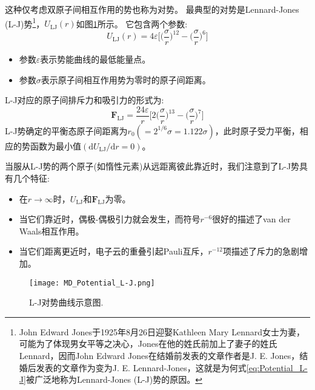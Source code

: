 这种仅考虑双原子间相互作用的势也称为对势。%
最典型的对势是\textrm{Lennard-Jones (L-J)}势\cite{PRS106-463_1924}\footnote{\textrm{John Edward Jones}于1925年8月26日迎娶\textrm{Kathleen Mary Lennard}女士为妻，可能为了体现男女平等之决心，\textrm{Jones}在他的姓氏前加上了妻子的姓氏\textrm{Lennard}，因而\textrm{John Edward Jones}在结婚前发表的文章作者是\textrm{J. E. Jones}，结婚后发表的文章作为变为{J. E. Lennard-Jones}，这就是为何式\eqref{eq:Potential_L-J}被广泛地称为\textrm{Lennard-Jones (L-J)}势的原因。}，$U_{\mathrm{LJ}}(r)$如图\ref{Curve_L-J}所示。%
它包含两个参数:~
\begin{equation}
	U_{\mathrm{LJ}}(r)=4\varepsilon\bigg[\bigg(\dfrac{\sigma}r\bigg)^{12}-\bigg(\dfrac{\sigma}r\bigg)^6\bigg]
	\label{eq:Potential_L-J}
\end{equation}
\begin{itemize}
	\item 参数$\varepsilon$表示势能曲线的最低能量点。%
	\item 参数$\sigma$表示原子间相互作用势为零时的原子间距离。
\end{itemize}
\textrm{L-J}对应的原子间排斥力和吸引力的形式为:~
\begin{equation}
	\mathbf{F}_{\mathrm{LJ}}=\dfrac{24\varepsilon}{r}\bigg[2\bigg(\dfrac{\sigma}r\bigg)^{13}-\bigg(\dfrac{\sigma}r\bigg)^7\bigg]
	\label{eq:Focrce_L-J}
\end{equation}
\textrm{L-J}势确定的平衡态原子间距离为$r_0(=2^{1/6}\sigma=1.122\sigma)$，此时原子受力平衡，相应的势函数为最小值$(\mathrm{d}U_{\mathrm{LJ}}/\mathrm{d}r=0)$。

当服从\textrm{L-J}势的两个原子(如惰性元素)从远距离彼此靠近时，我们注意到了\textrm{L-J}势具有几个特征:~
\begin{itemize}
	\item 在$r\rightarrow\infty$时，$U_{\mathrm{LJ}}$和$\mathbf{F_{\mathrm{LJ}}}$为零。
	\item 当它们靠近时，偶极-偶极引力就会发生，而符号$r^{-6}$很好的描述了\textrm{van der Waals}相互作用。
	\item 当它们距离更近时，电子云的重叠引起\textrm{Pauli}互斥，$r^{-12}$项描述了斥力的急剧增加。
\end{itemize}
\begin{figure}[h!]
\centering
\vspace*{-0.1in}
\texttt{[image: MD\_Potential\_L-J.png]}
\caption{\textrm{L-J}对势曲线示意图.}%
\label{Curve_L-J}
\end{figure}

